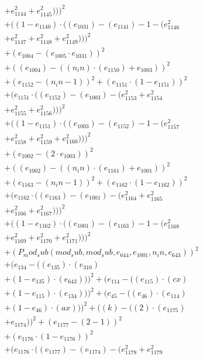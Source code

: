 \documentclass[10pt, a4paper]{article}
\begin{document}
\begin{align*}
& + e_{1144}^{2} + e_{1145}^{2})))^{2} \\
& + ((1 - e_{1140})  \cdot  ((e_{1031}) - (e_{1141}) - 1 - (e_{1146}^{2} \\
& + e_{1147}^{2} + e_{1148}^{2} + e_{1149}^{2})))^{2} \\
& + (e_{1004} - (e_{1005}  \cdot  e_{1031}))^{2} \\
& + ((e_{1004}) - ((n_in)  \cdot  (e_{1150}) + e_{1003}))^{2} \\
& + (e_{1152} - (n_in - 1))^{2} + (e_{1151}  \cdot  (1 - e_{1151}))^{2} \\
& + (e_{1151}  \cdot  ((e_{1152}) - (e_{1003}) - (e_{1153}^{2} + e_{1154}^{2} \\
& + e_{1155}^{2} + e_{1156}^{2})))^{2} \\
& + ((1 - e_{1151})  \cdot  ((e_{1003}) - (e_{1152}) - 1 - (e_{1157}^{2} \\
& + e_{1158}^{2} + e_{1159}^{2} + e_{1160}^{2})))^{2} \\
& + (e_{1002} - (2  \cdot  e_{1003}))^{2} \\
& + ((e_{1002}) - ((n_in)  \cdot  (e_{1161}) + e_{1001}))^{2} \\
& + (e_{1163} - (n_in - 1))^{2} + (e_{1162}  \cdot  (1 - e_{1162}))^{2} \\
& + (e_{1162}  \cdot  ((e_{1163}) - (e_{1001}) - (e_{1164}^{2} + e_{1165}^{2} \\
& + e_{1166}^{2} + e_{1167}^{2})))^{2} \\
& + ((1 - e_{1162})  \cdot  ((e_{1001}) - (e_{1163}) - 1 - (e_{1168}^{2} \\
& + e_{1169}^{2} + e_{1170}^{2} + e_{1171}^{2})))^{2} \\
& + (P_mod_sub(mod_sub, mod_sub, e_{644}, e_{1001}, n_in, e_{643}))^{2} \\
& + (e_{134} - ((e_{135})  \cdot  (e_{310}) \\
& + (1 - e_{135})  \cdot  (e_{643})))^{2} + (e_{114} - ((e_{115})  \cdot  (cx) \\
& + (1 - e_{115})  \cdot  (e_{134})))^{2} + (e_{45} - ((e_{46})  \cdot  (e_{114}) \\
& + (1 - e_{46})  \cdot  (ax)))^{2} + ((k) - ((2)  \cdot  (e_{1175}) \\
& + e_{1174}))^{2} + (e_{1177} - (2 - 1))^{2} \\
& + (e_{1176}  \cdot  (1 - e_{1176}))^{2} \\
& + (e_{1176}  \cdot  ((e_{1177}) - (e_{1174}) - (e_{1178}^{2} + e_{1179}^{2} \\

\end{align*}
\end{document}

